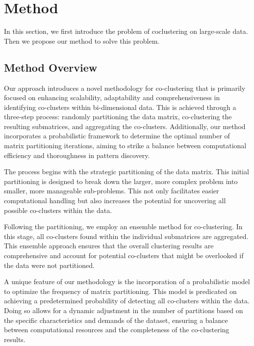 

\section{Method}

In this section, we first introduce the problem of coclustering on large-scale data. Then we propose our method to solve this problem.

\subsection{Method Overview}

Our approach introduces a novel methodology for co-clustering that is primarily focused on enhancing scalability, adaptability and comprehensiveness in identifying co-clusters within bi-dimensional data. This is achieved through a three-step process: randomly partitioning the data matrix, co-clustering the resulting submatrices, and aggregating the co-clusters. Additionally, our method incorporates a probabilistic framework to determine the optimal number of matrix partitioning iterations, aiming to strike a balance between computational efficiency and thoroughness in pattern discovery. 

The process begins with the strategic partitioning of the data matrix. This initial partitioning is designed to break down the larger, more complex problem into smaller, more manageable sub-problems. This not only facilitates easier computational handling but also increases the potential for uncovering all possible co-clusters within the data.

Following the partitioning, we employ an ensemble method for co-clustering. In this stage, all co-clusters found within the individual submatrices are aggregated. This ensemble approach ensures that the overall clustering results are comprehensive and account for potential co-clusters that might be overlooked if the data were not partitioned.

A unique feature of our methodology is the incorporation of a probabilistic model to optimize the frequency of matrix partitioning. This model is predicated on achieving a predetermined probability of detecting all co-clusters within the data. Doing so allows for a dynamic adjustment in the number of partitions based on the specific characteristics and demands of the dataset, ensuring a balance between computational resources and the completeness of the co-clustering results.

